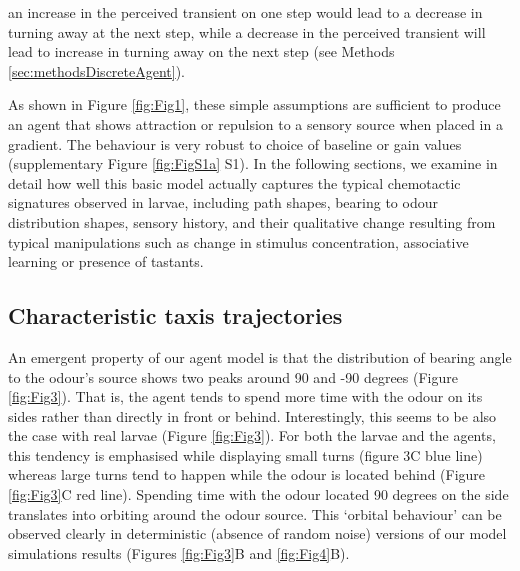 \documentclass[10pt,a4paper]{article}
\begin{document}
\begin{itemize}
an increase in the perceived transient on one step would lead to a decrease in turning away at the next step, while a decrease in the perceived transient will lead to increase in turning away on the next step (see Methods \ref{sec:methodsDiscreteAgent}).
\end{itemize}

As shown in Figure \ref{fig:Fig1}, these simple assumptions are sufficient to produce an agent that shows attraction or repulsion
 to a sensory source when placed in a gradient.  The behaviour is very robust to choice of baseline or gain values (supplementary Figure \ref{fig:FigS1a} S1). In the following sections, we examine in detail how well this basic model actually captures the typical chemotactic signatures observed in larvae, including path shapes, bearing to odour distribution shapes, sensory history, and their qualitative change resulting from typical manipulations such as change in stimulus concentration, associative learning or presence of tastants.


\subsection{Characteristic taxis trajectories}
An emergent property of our agent model is that the distribution of bearing angle to the odour's source shows two peaks around 90 and -90 degrees (Figure \ref{fig:Fig3}). That is, the agent tends to spend more time with the odour on its sides rather than directly in front or behind. Interestingly, this seems to be also the case with real larvae (Figure \ref{fig:Fig3}). For both the larvae and the agents, this tendency is emphasised while displaying small turns (figure 3C blue line) whereas large turns tend to happen while the odour is located behind (Figure \ref{fig:Fig3}C red line). Spending time with the odour located 90 degrees on the side translates into orbiting around the odour source. This ‘orbital behaviour’ can be observed clearly in deterministic (absence of random noise) versions of our model simulations results (Figures \ref{fig:Fig3}B and \ref{fig:Fig4}B).
\end{document}

